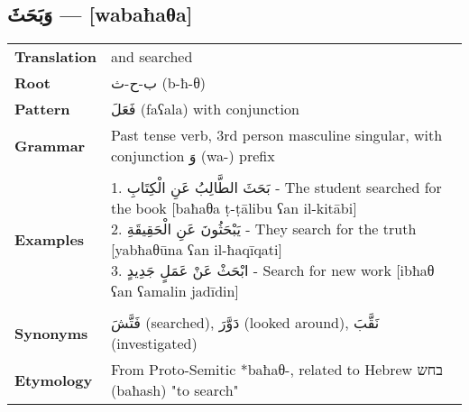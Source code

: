 \documentclass[letter,12pt]{article}
\begin{document}
\subsection{\textarabic{وَبَحَثَ} — [wabaħaθa]}
\begin{tabular}{p{3cm}p{10cm}}
\toprule
\textbf{Translation} & and searched \\
\textbf{Root} & \textarabic{ب-ح-ث} (b-ħ-θ) \\
\textbf{Pattern} & \textarabic{فَعَلَ} (faʕala) with conjunction \\
\textbf{Grammar} & Past tense verb, 3rd person masculine singular, with conjunction \textarabic{وَ} (wa-) prefix \\
\midrule \\
\textbf{Examples} & \makecell[l]{\parbox{9.5cm}{
1. \textarabic{بَحَثَ الطَّالِبُ عَنِ الْكِتَابِ} - The student searched for the book [baħaθa ṭ-ṭālibu ʕan il-kitābi]\\
2. \textarabic{يَبْحَثُونَ عَنِ الْحَقِيقَةِ} - They search for the truth [yabħaθūna ʕan il-ħaqīqati]\\
3. \textarabic{ابْحَثْ عَنْ عَمَلٍ جَدِيدٍ} - Search for new work [ibħaθ ʕan ʕamalin jadīdin]
}} \\
\midrule \\
\textbf{Synonyms} & \textarabic{فَتَّشَ} (searched), \textarabic{دَوَّرَ} (looked around), \textarabic{نَقَّبَ} (investigated) \\
\textbf{Etymology} & From Proto-Semitic *baħaθ-, related to Hebrew \texthebrew{בחש} (baħash) "to search" \\
\bottomrule
\end{tabular}
\end{document}
